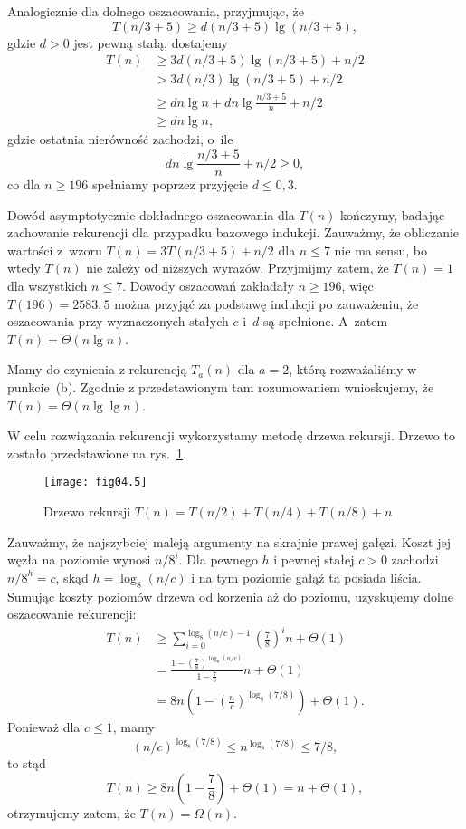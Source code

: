 Analogicznie dla dolnego oszacowania, przyjmując, że
\[
	T(n/3+5) \ge d(n/3+5)\lg(n/3+5),
\]
gdzie $d>0$ jest pewną stałą, dostajemy
\begin{align*}
	T(n) &\ge 3d(n/3+5)\lg(n/3+5)+n/2 \\
	&> 3d(n/3)\lg(n/3+5)+n/2 \\
	&\ge dn\lg n+dn\lg\frac{n/3+5}{n}+n/2 \\
	&\ge dn\lg n,
\end{align*}
gdzie ostatnia nierówność zachodzi, o~ile
\[
    dn\lg\frac{n/3+5}{n}+n/2 \ge 0,
\]
co dla $n\ge196$ spełniamy poprzez przyjęcie $d\le0{,}3$.

Dowód asymptotycznie dokładnego oszacowania dla $T(n)$ kończymy, badając zachowanie rekurencji dla przypadku bazowego indukcji. Zauważmy, że obliczanie wartości z~wzoru $T(n)=3T(n/3+5)+n/2$ dla $n\le7$ nie ma sensu, bo wtedy $T(n)$ nie zależy od niższych wyrazów. Przyjmijmy zatem, że $T(n)=1$ dla wszystkich $n\le7$. Dowody oszacowań zakładały $n\ge196$, więc $T(196)=2583{,}5$ można przyjąć za podstawę indukcji po zauważeniu, że oszacowania przy wyznaczonych stałych $c$ i~$d$ są spełnione. A~zatem $T(n)=\Theta(n\lg n)$.

\subproblem %
Mamy do czynienia z rekurencją $T_a(n)$ dla $a=2$, którą rozważaliśmy w punkcie~(b). Zgodnie z przedstawionym tam rozumowaniem wnioskujemy, że $T(n)=\Theta(n\lg\lg n)$.

\subproblem %
W celu rozwiązania rekurencji wykorzystamy metodę drzewa rekursji. Drzewo to zostało przedstawione na rys.~\ref{fig:4-4f}.
\begin{figure}[ht]
	\begin{center}
		\texttt{[image: fig04.5]}
	\end{center}
	\caption{Drzewo rekursji $T(n)=T(n/2)+T(n/4)+T(n/8)+n$} \label{fig:4-4f}
\end{figure}

Zauważmy, że najszybciej maleją argumenty na skrajnie prawej gałęzi. Koszt jej węzła na  poziomie wynosi $n/8^i$. Dla pewnego $h$ i pewnej stałej $c>0$ zachodzi $n/8^h=c$, skąd $h=\log_8(n/c)$ i na tym poziomie gałąź ta posiada liścia. Sumując koszty poziomów drzewa od korzenia aż do  poziomu, uzyskujemy dolne oszacowanie rekurencji:
\begin{align*}
	T(n) &\ge \sum_{i=0}^{\log_8(n/c)-1}\left(\frac{7}{8}\right)^in+\Theta(1) \\
	&= \frac{1-\left(\frac{7}{8}\right)^{\log_8(n/c)}}{1-\frac{7}{8}}n+\Theta(1) \\
	&= 8n\left(1-\left(\frac{n}{c}\right)^{\log_8(7/8)}\right)+\Theta(1).
\end{align*}
Ponieważ dla $c\le1$, mamy
\[
    (n/c)^{\log_8(7/8)} \le n^{\log_8(7/8)} \le 7/8,
\]
to stąd
\[
    T(n) \ge 8n\left(1-\frac{7}{8}\right)+\Theta(1) = n+\Theta(1),
\]
otrzymujemy zatem, że $T(n)=\Omega(n)$.

